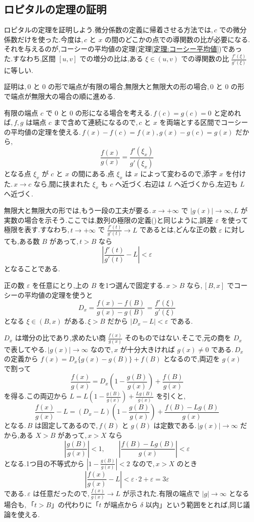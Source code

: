 \subsection{ロピタルの定理の証明}
ロピタルの定理を証明しよう.微分係数の定義に帰着させる方法では,\,$c$ での微分係数だけを使った.今度は,\,$c$ と $x$ の間のどこかの点での導関数の比が必要になる.それを与えるのが,コーシーの平均値の定理(定理\ref{定理:コーシー平均値})であった.すなわち,区間 $[u,v]$ での増分の比は,ある $\xi\in(u,v)$ での導関数の比 $\frac{f'(\xi)}{g'(\xi)}$ に等しい.

証明は,\,$0$ と $0$ の形で端点が有限の場合,無限大と無限大の形の場合,\,$0$ と $0$ の形で端点が無限大の場合の順に進める.

有限の端点 $c$ で $0$ と $0$ の形になる場合を考える.\,$f(c)=g(c)=0$ と定めれば,\,$f,g$ は端点 $c$ まで含めて連続になるので,\,$c$ と $x$ を両端とする区間でコーシーの平均値の定理を使える.\,$f(x)-f(c)=f(x)$,\,$g(x)-g(c)=g(x)$ だから,
\[
 \frac{f(x)}{g(x)}=\frac{f'(\xi_x)}{g'(\xi_x)}
\]
となる点 $\xi_x$ が $c$ と $x$ の間にある.点 $\xi_x$ は $x$ によって変わるので,添字 $x$ を付けた.\,$x\to c$ なら,間に挟まれた $\xi_x$ も $c$ へ近づく.右辺は $L$ へ近づくから,左辺も $L$ へ近づく.

無限大と無限大の形では,もう一段の工夫が要る.\,$x\to+\infty$ で $|g(x)|\to\infty$,\,$L$ が実数の場合を示そう.ここでは,数列の極限の定義()と同じように,誤差 $\varepsilon$ を使って極限を表す.すなわち,\,$t\to+\infty$ で $\frac{f'(t)}{g'(t)}\to L$ であるとは,どんな正の数 $\varepsilon$ に対しても,ある数 $B$ があって,\,$t>B$ なら
\[
 \left|\frac{f'(t)}{g'(t)}-L\right|<\varepsilon
\]
となることである.

正の数 $\varepsilon$ を任意にとり,上の $B$ を1つ選んで固定する.\,$x>B$ なら,\,$[B,x]$ でコーシーの平均値の定理を使うと
\[
 D_x=\frac{f(x)-f(B)}{g(x)-g(B)}=\frac{f'(\xi)}{g'(\xi)}
\]
となる $\xi\in(B,x)$ がある.\,$\xi>B$ だから $|D_x-L|<\varepsilon$ である.

$D_x$ は増分の比であり,求めたい商 $\frac{f(x)}{g(x)}$ そのものではない.そこで,元の商を $D_x$ で表してやる.\,$|g(x)|\to\infty$ なので,\,$x$ が十分大きければ $g(x)\ne0$ である.\,$D_x$ の定義から $f(x)=D_x\{g(x)-g(B)\}+f(B)$ となるので,両辺を $g(x)$ で割って
\[
 \frac{f(x)}{g(x)}
 =D_x\left(1-\frac{g(B)}{g(x)}\right)+\frac{f(B)}{g(x)}
\]
を得る.この両辺から $L=L\left(1-\frac{g(B)}{g(x)}\right)+\frac{Lg(B)}{g(x)}$ を引くと,
\[
 \frac{f(x)}{g(x)}-L
 =(D_x-L)\left(1-\frac{g(B)}{g(x)}\right)+\frac{f(B)-Lg(B)}{g(x)}
\]
となる.\,$B$ は固定してあるので,\,$f(B)$ と $g(B)$ は定数である.\,$|g(x)|\to\infty$ だから,ある $X>B$ があって,\,$x>X$ なら
\[
 \left|\frac{g(B)}{g(x)}\right|<1,\qquad
 \left|\frac{f(B)-Lg(B)}{g(x)}\right|<\varepsilon
\]
となる.1つ目の不等式から $\left|1-\frac{g(B)}{g(x)}\right|<2$ なので,\,$x>X$ のとき
\[
 \left|\frac{f(x)}{g(x)}-L\right|
 <\varepsilon\cdot2+\varepsilon=3\varepsilon
\]
である.\,$\varepsilon$ は任意だったので,\,$\frac{f(x)}{g(x)}\to L$ が示された.有限の端点で $|g|\to\infty$ となる場合も,\,「$t>B$」の代わりに「$t$ が端点から $\delta$ 以内」という範囲をとれば,同じ議論を使える.

